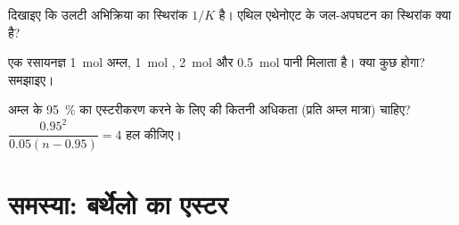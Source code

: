 \begin{exercise}[$\star\star\star$]\label{exo:g12:equilibrium:13}
दिखाइए कि उलटी अभिक्रिया का स्थिरांक $1/K$ है। एथिल एथेनोएट के
जल-अपघटन का स्थिरांक क्या है?
\end{exercise}

\begin{exercise}[$\star\star\star$]\label{exo:g12:equilibrium:14}
एक रसायनज्ञ \qty{1}{mol} अम्ल, \qty{1}{mol} ,
\qty{2}{mol}  और \qty{0.5}{mol} पानी मिलाता है। क्या कुछ होगा?
समझाइए।
\end{exercise}

\begin{exercise}[$\star\star\star$]\label{exo:g12:equilibrium:15}
अम्ल के \qty{95}{\percent} का एस्टरीकरण करने के लिए  की कितनी अधिकता (प्रति  अम्ल मात्रा)
चाहिए? $\dfrac{0.95^2}{0.05(n - 0.95)} =
4$ हल कीजिए।
\end{exercise}

\section{समस्या: बर्थेलो का एस्टर}

